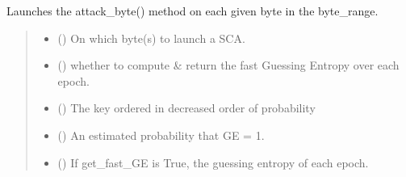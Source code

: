 \documentclass[letterpaper,10pt,english]{sphinxmanual}
\begin{document}
\begin{fulllineitems}
\begin{fulllineitems}
\label{\detokenize{MLSCAlib.Attacks:MLSCAlib.Attacks.profiled.Profiled.attack_bytes}}
\pysigstartsignatures
{}
\pysigstopsignatures
\sphinxAtStartPar
Launches the attack\_byte() method on each given byte in the byte\_range.
\begin{quote}\begin{description}
\begin{itemize}
\item {} 
\sphinxAtStartPar
{} (\sphinxstyleliteralemphasis{\sphinxupquote{{[}}}\sphinxstyleliteralemphasis{\sphinxupquote{{]} }}\sphinxstyleliteralemphasis{\sphinxupquote{| }}) \textendash{} On which byte(s) to launch a SCA.

\item {} 
\sphinxAtStartPar
{} (\sphinxstyleliteralemphasis{\sphinxupquote{, }}) \textendash{} whether to compute \& return the fast Guessing Entropy over each epoch.

\end{itemize}

\sphinxAtStartPar
\begin{itemize}
\item {} 
\sphinxAtStartPar
{} () \textendash{} The key ordered in decreased order of probability

\item {} 
\sphinxAtStartPar
{} () \textendash{} An estimated probability that GE = 1.

\item {} 
\sphinxAtStartPar
{} () \textendash{} If get\_fast\_GE is True, the guessing entropy of each epoch.

\end{itemize}



\end{description}
\end{quote}
\end{fulllineitems}
\end{fulllineitems}
\end{document}
